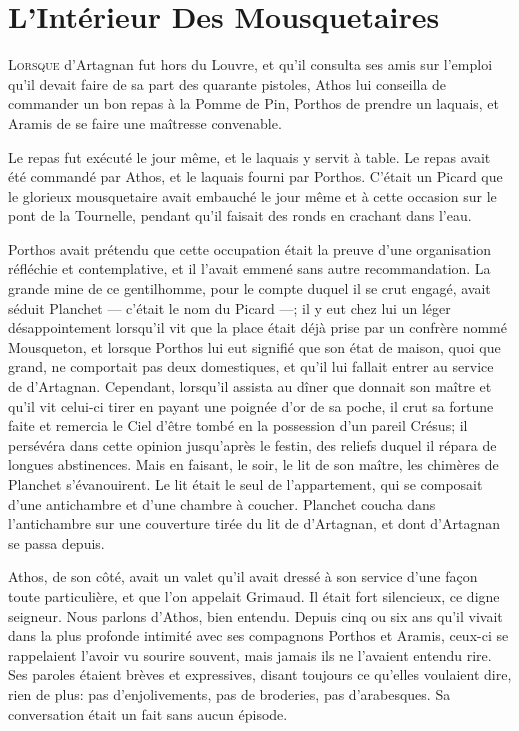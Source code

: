 
\chapter{L'Intérieur Des Mousquetaires}

\lettrine{L}{orsque} d'Artagnan fut hors du Louvre, et qu'il consulta ses amis sur l'emploi qu'il devait faire de sa part des quarante pistoles, Athos lui conseilla de commander un bon repas à la Pomme de Pin, Porthos de prendre un laquais, et Aramis de se faire une maîtresse convenable. 

Le repas fut exécuté le jour même, et le laquais y servit à table. Le repas avait été commandé par Athos, et le laquais fourni par Porthos. C'était un Picard que le glorieux mousquetaire avait embauché le jour même et à cette occasion sur le pont de la Tournelle, pendant qu'il faisait des ronds en crachant dans l'eau. 

Porthos avait prétendu que cette occupation était la preuve d'une organisation réfléchie et contemplative, et il l'avait emmené sans autre recommandation. La grande mine de ce gentilhomme, pour le compte duquel il se crut engagé, avait séduit Planchet --- c'était le nom du Picard ---; il y eut chez lui un léger désappointement lorsqu'il vit que la place était déjà prise par un confrère nommé Mousqueton, et lorsque Porthos lui eut signifié que son état de maison, quoi que grand, ne comportait pas deux domestiques, et qu'il lui fallait entrer au service de d'Artagnan. Cependant, lorsqu'il assista au dîner que donnait son maître et qu'il vit celui-ci tirer en payant une poignée d'or de sa poche, il crut sa fortune faite et remercia le Ciel d'être tombé en la possession d'un pareil Crésus; il persévéra dans cette opinion jusqu'après le festin, des reliefs duquel il répara de longues abstinences. Mais en faisant, le soir, le lit de son maître, les chimères de Planchet s'évanouirent. Le lit était le seul de l'appartement, qui se composait d'une antichambre et d'une chambre à coucher. Planchet coucha dans l'antichambre sur une couverture tirée du lit de d'Artagnan, et dont d'Artagnan se passa depuis. 

Athos, de son côté, avait un valet qu'il avait dressé à son service d'une façon toute particulière, et que l'on appelait Grimaud. Il était fort silencieux, ce digne seigneur. Nous parlons d'Athos, bien entendu. Depuis cinq ou six ans qu'il vivait dans la plus profonde intimité avec ses compagnons Porthos et Aramis, ceux-ci se rappelaient l'avoir vu sourire souvent, mais jamais ils ne l'avaient entendu rire. Ses paroles étaient brèves et expressives, disant toujours ce qu'elles voulaient dire, rien de plus: pas d'enjolivements, pas de broderies, pas d'arabesques. Sa conversation était un fait sans aucun épisode. 

